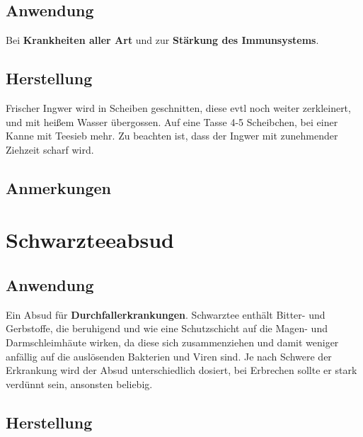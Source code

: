   

\subsection{Anwendung}


Bei \textbf{Krankheiten aller Art} und zur \textbf{Stärkung des Immunsystems}.

\subsection{Herstellung}

Frischer Ingwer wird in Scheiben geschnitten, diese evtl noch weiter zerkleinert, und mit heißem Wasser übergossen. Auf eine Tasse 4-5 Scheibchen, bei einer Kanne mit Teesieb mehr. Zu beachten ist, dass der Ingwer mit zunehmender Ziehzeit scharf wird.

\subsection{Anmerkungen}


\newpage



\section{Schwarzteeabsud}



\subsection{Anwendung}

Ein Absud für \textbf{Durchfallerkrankungen}. Schwarztee enthält Bitter- und Gerbstoffe, die beruhigend und wie eine Schutzschicht auf die Magen- und Darmschleimhäute wirken, da diese sich zusammenziehen und damit weniger anfällig auf die auslösenden Bakterien und Viren sind. Je nach Schwere der Erkrankung wird der Absud unterschiedlich dosiert, bei Erbrechen sollte er stark verdünnt sein, ansonsten beliebig.

\subsection{Herstellung}

